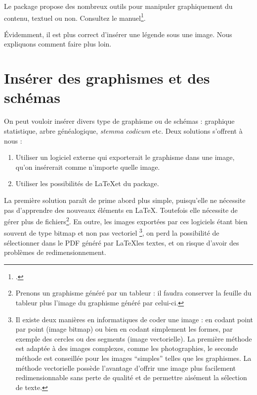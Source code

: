 \begin{plusloins}
Le package  propose des nombreux outils pour manipuler graphiquement du contenu, textuel ou non. Consultez le manuel\footcite{graphicx}.
\end{plusloins}

\begin{attention}
    Évidemment, il est plus correct d'insérer une légende sous une image. Nous expliquons comment faire plus loin.
\end{attention}

\section{Insérer des graphismes et des schémas}

On peut vouloir insérer divers type de graphisme ou de schémas : graphique statistique, arbre généalogique, \emph{stemma codicum} etc.
Deux solutions s'offrent à nous :
\begin{enumerate}
\item Utiliser un logiciel externe qui exporterait le graphisme dans une image, qu'on insérerait comme n'importe quelle image.
\item Utiliser les possibilités de \LaTeX et du package.\label{TikZ}
\end{enumerate}

La première solution paraît de prime abord plus simple, puisqu'elle ne nécessite pas d'apprendre des nouveaux éléments en \LaTeX. Toutefois elle nécessite de gérer plus de fichiers\footnote{Prenons un graphisme généré par un tableur : il faudra conserver la feuille du tableur plus l'image du graphisme généré par celui-ci.}. En outre, les images exportées par ces logiciels étant bien souvent de type bitmap et non pas vectoriel%
\footnote{Il existe deux manières en informatiques de coder une image : en codant point par point (image bitmap) ou bien en codant simplement les formes, par exemple des cercles ou des segments (image vectorielle). La première méthode est adaptée à des images complexes, comme les photographies,  le seconde méthode est conseillée pour les images \enquote{simples} telles que les graphismes. La méthode vectorielle possède l'avantage d'offrir une image plus facilement redimensionnable  sans perte de qualité et de permettre aisément la sélection de texte.},
on perd la possibilité de sélectionner dans le PDF généré par \LaTeX les textes, et on risque d'avoir des problèmes de redimensionnement.

